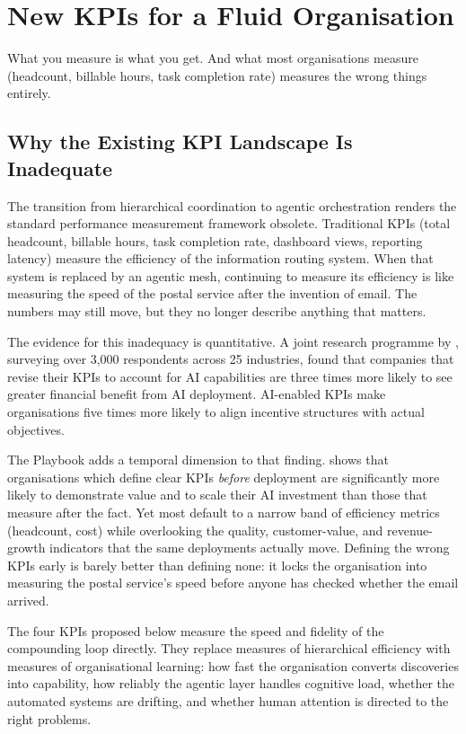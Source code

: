 \chapter{New KPIs for a Fluid Organisation}
\label{ch:new-kpis}

\epigraph{What you measure is what you get. And what most organisations measure (headcount, billable hours, task completion rate) measures the wrong things entirely.}{}

\section{Why the Existing KPI Landscape Is Inadequate}

The transition from hierarchical coordination to agentic orchestration renders the standard performance measurement framework obsolete. Traditional KPIs (total headcount, billable hours, task completion rate, dashboard views, reporting latency) measure the efficiency of the information routing system. When that system is replaced by an agentic mesh, continuing to measure its efficiency is like measuring the speed of the postal service after the invention of email. The numbers may still move, but they no longer describe anything that matters.

The evidence for this inadequacy is quantitative. A joint research programme by \textcite{BCGAIKPIs2025}, surveying over 3,000 respondents across 25 industries, found that companies that revise their KPIs to account for AI capabilities are three times more likely to see greater financial benefit from AI deployment. AI-enabled KPIs make organisations five times more likely to align incentive structures with actual objectives.

The Playbook adds a temporal dimension to that finding. \textcite{Pereira2026Playbook} shows that organisations which define clear KPIs \emph{before} deployment are significantly more likely to demonstrate value and to scale their AI investment than those that measure after the fact. Yet most default to a narrow band of efficiency metrics (headcount, cost) while overlooking the quality, customer-value, and revenue-growth indicators that the same deployments actually move. Defining the wrong KPIs early is barely better than defining none: it locks the organisation into measuring the postal service's speed before anyone has checked whether the email arrived.

The four KPIs proposed below measure the speed and fidelity of the compounding loop directly. They replace measures of hierarchical efficiency with measures of organisational learning: how fast the organisation converts discoveries into capability, how reliably the agentic layer handles cognitive load, whether the automated systems are drifting, and whether human attention is directed to the right problems.

